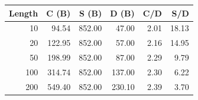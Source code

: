 \begin{tabular}{rrrrrr}
\toprule
\textbf{Length} & \textbf{C (B)} & \textbf{S (B)} & \textbf{D (B)} & \textbf{C/D} & \textbf{S/D} \\
\midrule
10 & 94.54 & 852.00 & 47.00 & 2.01 & 18.13 \\
20 & 122.95 & 852.00 & 57.00 & 2.16 & 14.95 \\
50 & 198.99 & 852.00 & 87.00 & 2.29 & 9.79 \\
100 & 314.74 & 852.00 & 137.00 & 2.30 & 6.22 \\
200 & 549.40 & 852.00 & 230.10 & 2.39 & 3.70 \\
\bottomrule
\end{tabular}
